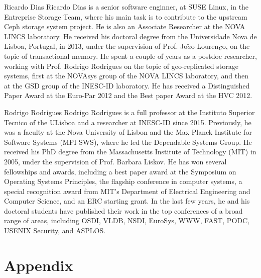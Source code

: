 \documentclass[journal,compsoc]{IEEEtran}
\begin{document}
 \newcommand{\ut}[1]{\underaccent{\tilde}{#1}}
 \renewcommand{\vec}[1]{\ut{#1}}
 \begin{IEEEbiography}{Ricardo Dias}
 Ricardo Dias is a senior software enginner, at SUSE Linux, in the Entreprise Storage Team, where his main task is to contribute to the upstream Ceph storage system project. He is also an Associate Researcher at the NOVA LINCS laboratory. He received his doctoral degree from the Universidade Nova de Lisboa, Portugal, in 2013, under the supervision of Prof. Jo$\tilde{a}$o Louren$\vec{c}$o, on the topic of transactional memory. He spent a couple of years as a postdoc researcher, working with Prof. Rodrigo Rodrigues on the topic of geo-replicated storage systems, first at the NOVAsys group of the NOVA LINCS laboratory, and then at the GSD group of the INESC-ID laboratory.
 He has received a Distinguished Paper Award at the Euro-Par 2012 and the Best paper Award at the HVC 2012.
 \end{IEEEbiography}
 \begin{IEEEbiography}{Rodrigo Rodrigues}
 Rodrigo Rodrigues is a full professor at the Instituto Superior Tecnico of the ULisboa and a researcher at INESC-ID since 2015. Previously, he was a faculty at the Nova University of Lisbon and the Max Planck Institute for Software Systems (MPI-SWS), where he led the Dependable Systems Group. He received his PhD degree from the Massachusetts Institute of Technology (MIT) in 2005, under the supervision of Prof. Barbara Liskov. He has won several fellowships and awards, including a best paper award at the Symposium on Operating Systems Principles, the flagship conference in computer systems, a special recognition award from MIT's Department of Electrical Engineering and Computer Science, and an ERC starting grant. In the last few years, he and his doctoral students have published their work in the top conferences of a broad range of areas, including OSDI, VLDB, NSDI, EuroSys, WWW, FAST, PODC, USENIX Security, and ASPLOS.
 \end{IEEEbiography}
\section{Appendix}\label{sec:appendix}
\end{document}
